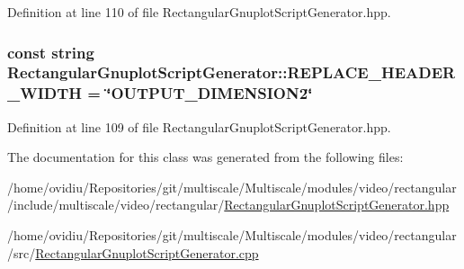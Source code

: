 \-Definition at line 110 of file \-Rectangular\-Gnuplot\-Script\-Generator.\-hpp.

\hypertarget{classmultiscale_1_1video_1_1RectangularGnuplotScriptGenerator_a2b9a87b266a126d6cdd6d6ee1d707b87}{
\subsubsection[{\-R\-E\-P\-L\-A\-C\-E\-\_\-\-H\-E\-A\-D\-E\-R\-\_\-\-W\-I\-D\-T\-H}]{\setlength{\rightskip}{0pt plus 5cm}const string {\bf \-Rectangular\-Gnuplot\-Script\-Generator\-::\-R\-E\-P\-L\-A\-C\-E\-\_\-\-H\-E\-A\-D\-E\-R\-\_\-\-W\-I\-D\-T\-H} = \char`\"{}\-O\-U\-T\-P\-U\-T\-\_\-\-D\-I\-M\-E\-N\-S\-I\-O\-N2\char`\"{}}}\label{classmultiscale_1_1video_1_1RectangularGnuplotScriptGenerator_a2b9a87b266a126d6cdd6d6ee1d707b87}


\-Definition at line 109 of file \-Rectangular\-Gnuplot\-Script\-Generator.\-hpp.



\-The documentation for this class was generated from the following files\-:\begin{DoxyCompactItemize}
\item 
/home/ovidiu/\-Repositories/git/multiscale/\-Multiscale/modules/video/rectangular/include/multiscale/video/rectangular/\hyperlink{RectangularGnuplotScriptGenerator_8hpp}{\-Rectangular\-Gnuplot\-Script\-Generator.\-hpp}\item 
/home/ovidiu/\-Repositories/git/multiscale/\-Multiscale/modules/video/rectangular/src/\hyperlink{RectangularGnuplotScriptGenerator_8cpp}{\-Rectangular\-Gnuplot\-Script\-Generator.\-cpp}\end{DoxyCompactItemize}
